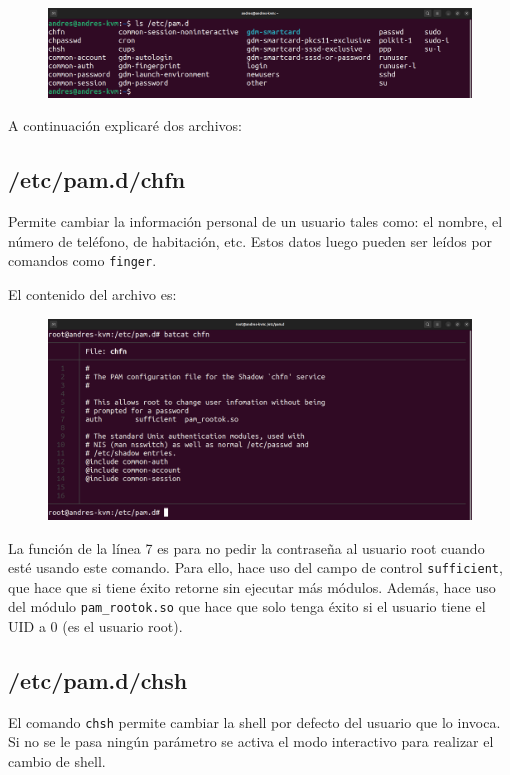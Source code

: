 \documentclass{article}
\begin{document}
\begin{figure}[H]
    \includegraphics[width=\textwidth]{imagenes/lspam.png}
\end{figure}

A continuación explicaré dos archivos:

\subsection*{/etc/pam.d/chfn}
Permite cambiar la información personal de un usuario tales como: el nombre, el número de teléfono, de habitación, etc. Estos datos luego pueden ser leídos por comandos como \verb|finger|.

\bigskip

El contenido del archivo es:

\begin{figure}[H]
    \includegraphics[width=\textwidth]{imagenes/pamchfn.png}
\end{figure}

La función de la línea 7 es para no pedir la contraseña al usuario root cuando esté usando este comando. Para ello, hace uso del campo de control \verb|sufficient|, que hace que si tiene éxito retorne sin ejecutar más módulos. Además, hace uso del módulo \verb|pam_rootok.so| que hace que solo tenga éxito si el usuario tiene el UID a 0 (es el usuario root).

\newpage

\subsection*{/etc/pam.d/chsh}
El comando \verb|chsh| permite cambiar la shell por defecto del usuario que lo invoca. Si no se le pasa ningún parámetro se activa el modo interactivo para realizar el cambio de shell.
\end{document}
